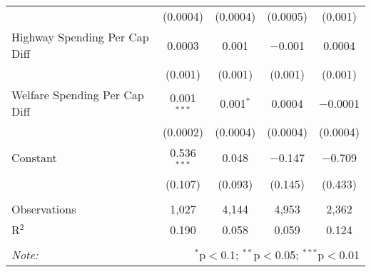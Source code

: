 \begin{table}[!htbp]
\begin{tabular}{@{\extracolsep{5pt}}lcccc}
  & (0.0004) & (0.0004) & (0.0005) & (0.001) \\ 
  Highway Spending Per Cap Diff & 0.0003 & 0.001 & $-$0.001 & 0.0004 \\ 
  & (0.001) & (0.001) & (0.001) & (0.001) \\ 
  Welfare Spending Per Cap Diff & 0.001$^{***}$ & 0.001$^{*}$ & 0.0004 & $-$0.0001 \\ 
  & (0.0002) & (0.0004) & (0.0004) & (0.0004) \\ 
  Constant & 0.536$^{***}$ & 0.048 & $-$0.147 & $-$0.709 \\ 
  & (0.107) & (0.093) & (0.145) & (0.433) \\ 
 \hline \\[-1.8ex] 
Observations & 1,027 & 4,144 & 4,953 & 2,362 \\ 
R$^{2}$ & 0.190 & 0.058 & 0.059 & 0.124 \\ 
\hline 
\hline \\[-1.8ex] 
\textit{Note:}  & \multicolumn{4}{r}{$^{*}$p$<$0.1; $^{**}$p$<$0.05; $^{***}$p$<$0.01} \\ 
\end{tabular} 
\end{table} 
